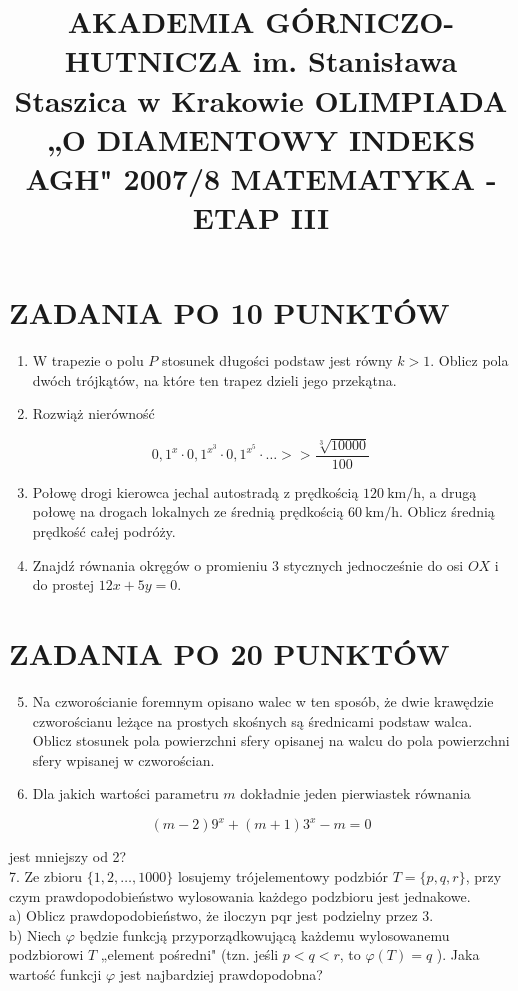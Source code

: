 \documentclass[10pt]{article}
\title{AKADEMIA GÓRNICZO-HUTNICZA im. Stanisława Staszica w Krakowie OLIMPIADA „O DIAMENTOWY INDEKS AGH" 2007/8 MATEMATYKA - ETAP III }
\author{}
\date{}
\begin{document}
\maketitle
\section*{ZADANIA PO 10 PUNKTÓW}
\begin{enumerate}
  \item W trapezie o polu $P$ stosunek długości podstaw jest równy $k>1$. Oblicz pola dwóch trójkątów, na które ten trapez dzieli jego przekątna.
  \item Rozwiąż nierówność
\end{enumerate}

$$
0,1^{x} \cdot 0,1^{x^{3}} \cdot 0,1^{x^{5}} \cdot \ldots>>\frac{\sqrt[3]{10000}}{100}
$$

\begin{enumerate}
  \setcounter{enumi}{2}
  \item Połowę drogi kierowca jechal autostradą z prędkością $120 \mathrm{~km} / \mathrm{h}$, a drugą połowę na drogach lokalnych ze średnią prędkością $60 \mathrm{~km} / \mathrm{h}$. Oblicz średnią prędkość całej podróży.
  \item Znajdź równania okręgów o promieniu 3 stycznych jednocześnie do osi $O X$ i do prostej $12 x+5 y=0$.
\end{enumerate}

\section*{ZADANIA PO 20 PUNKTÓW}
\begin{enumerate}
  \setcounter{enumi}{4}
  \item Na czworościanie foremnym opisano walec w ten sposób, że dwie krawędzie czworościanu leżące na prostych skośnych są średnicami podstaw walca. Oblicz stosunek pola powierzchni sfery opisanej na walcu do pola powierzchni sfery wpisanej w czworościan.
  \item Dla jakich wartości parametru $m$ dokładnie jeden pierwiastek równania
\end{enumerate}

$$
(m-2) 9^{x}+(m+1) 3^{x}-m=0
$$

jest mniejszy od 2?\\
7. Ze zbioru $\{1,2, \ldots, 1000\}$ losujemy trójelementowy podzbiór $T=\{p, q, r\}$, przy czym prawdopodobieństwo wylosowania każdego podzbioru jest jednakowe.\\
a) Oblicz prawdopodobieństwo, że iloczyn pqr jest podzielny przez 3.\\
b) Niech $\varphi$ będzie funkcją przyporządkowującą każdemu wylosowanemu podzbiorowi $T$ „element pośredni" (tzn. jeśli $p<q<r$, to $\varphi(T)=q$ ). Jaka wartość funkcji $\varphi$ jest najbardziej prawdopodobna?
\end{document}
